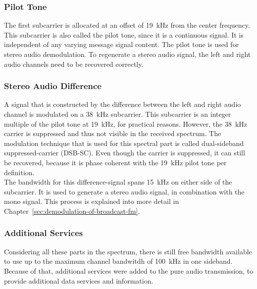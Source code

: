 \subsubsection{Pilot Tone}

The first subcarrier is allocated at an offset of 19~kHz from the center frequency.
This subcarrier is also called the pilot tone, since it is a continuous signal.
It is independent of any varying message signal content.
The pilot tone is used for stereo audio demodulation.
To regenerate a stereo audio signal, the left and right audio channels need to be recovered correctly.

\subsubsection{Stereo Audio Difference}

A signal that is constructed by the difference between the left and right audio channel is modulated on a 38~kHz subcarrier.
This subcarrier is an integer multiple of the pilot tone at 19~kHz, for practical reasons.
However, the 38~kHz carrier is suppressed and thus not visible in the received spectrum.
The modulation technique that is used for this spectral part is called dual-sideband suppressed-carrier (DSB-SC).
Even though the carrier is suppressed, it can still be recovered, because it is phase coherent with the 19~kHz pilot tone per definition.\\

The bandwidth for this difference-signal spans 15~kHz on either side of the subcarrier.
It is used to generate a stereo audio signal, in combination with the mono signal.
This process is explained into more detail in Chapter~\ref{sec:demodulation-of-broadcast-fm}.

\subsubsection{Additional Services}

Considering all these parts in the spectrum, there is still free bandwidth available to use up to the maximum channel bandwitdh of 100~kHz in one sideband.
Because of that, additional services were added to the pure audio transmission, to provide additional data services and information.\\

